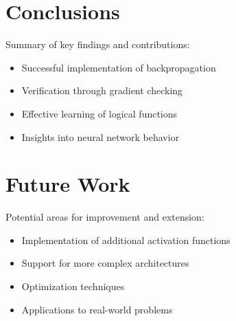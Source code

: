 \documentclass[11pt,a4paper]{article}
\begin{document}
\section{Conclusions}
\label{sec:conclusions}
Summary of key findings and contributions:
\begin{itemize}
    \item Successful implementation of backpropagation
    \item Verification through gradient checking
    \item Effective learning of logical functions
    \item Insights into neural network behavior
\end{itemize}

\section{Future Work}
\label{sec:future}
Potential areas for improvement and extension:
\begin{itemize}
    \item Implementation of additional activation functions
    \item Support for more complex architectures
    \item Optimization techniques
    \item Applications to real-world problems
\end{itemize}



\end{document}
